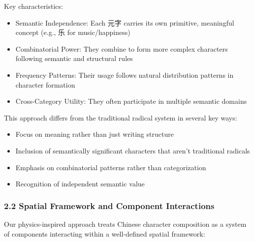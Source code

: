 \documentclass[
  11pt,
  letterpaper,
]{article}
\providecommand{\tightlist}{%
  \setlength{\itemsep}{0pt}\setlength{\parskip}{0pt}}
\begin{document}
Key characteristics:

\begin{itemize}
\tightlist
\item
  Semantic Independence: Each 元字 carries its own primitive, meaningful
  concept (e.g., 乐 for music/happiness)
\item
  Combinatorial Power: They combine to form more complex characters
  following semantic and structural rules
\item
  Frequency Patterns: Their usage follows natural distribution patterns
  in character formation
\item
  Cross-Category Utility: They often participate in multiple semantic
  domains
\end{itemize}

This approach differs from the traditional radical system in several key
ways:

\begin{itemize}
\tightlist
\item
  Focus on meaning rather than just writing structure
\item
  Inclusion of semantically significant characters that aren't
  traditional radicals
\item
  Emphasis on combinatorial patterns rather than categorization
\item
  Recognition of independent semantic value
\end{itemize}

\hypertarget{spatial-framework-and-component-interactions}{%
\subsubsection{2.2 Spatial Framework and Component
Interactions}\label{spatial-framework-and-component-interactions}}

Our physics-inspired approach treats Chinese character composition as a
system of components interacting within a well-defined spatial
framework:
\end{document}
